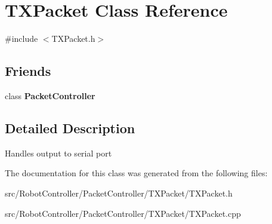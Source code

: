 \hypertarget{class_t_x_packet}{\section{T\+X\+Packet Class Reference}
\label{class_t_x_packet}
}


{\ttfamily \#include $<$T\+X\+Packet.\+h$>$}

\subsection*{Friends}
\begin{DoxyCompactItemize}
\item 
\hypertarget{class_t_x_packet_afcae7e144f5a566101e8a52106c0ba0a}{class {\bfseries Packet\+Controller}}\label{class_t_x_packet_afcae7e144f5a566101e8a52106c0ba0a}

\end{DoxyCompactItemize}


\subsection{Detailed Description}
Handles output to serial port 

The documentation for this class was generated from the following files\+:\begin{DoxyCompactItemize}
\item 
src/\+Robot\+Controller/\+Packet\+Controller/\+T\+X\+Packet/T\+X\+Packet.\+h\item 
src/\+Robot\+Controller/\+Packet\+Controller/\+T\+X\+Packet/T\+X\+Packet.\+cpp\end{DoxyCompactItemize}
